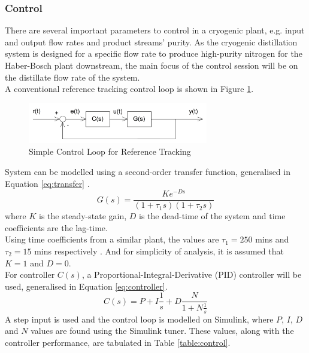 	\subsubsection{Control} \noindent
    	There are several important parameters to control in a cryogenic plant, e.g. input and output flow rates and product streams' purity. As the cryogenic distillation system is designed for a specific flow rate to produce high-purity nitrogen for the Haber-Bosch plant downstream, the main focus of the control session will be on the distillate flow rate of the system.\\
    	A conventional reference tracking control loop is shown in Figure \ref{fig:control_loop}.
    	\begin{figure}[H]
    	    \centering
    	    \includegraphics[width=0.7\textwidth]{airseparation/graphics/control_loop.jpg}
    	    \caption{Simple Control Loop for Reference Tracking}
    	    \label{fig:control_loop}
    	\end{figure}
    	\noindent System can be modelled using a second-order transfer function, generalised in Equation \ref{eq:transfer} \citep{control_transfer_function}.
    	\begin{equation}
    	    G(s) = \frac{Ke^{-Ds}}{(1+\tau _1s)(1+\tau _2s)}
    	    \label{eq:transfer}
    	\end{equation}
    	where $K$ is the steady-state gain, $D$ is the dead-time of the system and time coefficients are the lag-time. \\
    	Using time coefficients from a similar plant, the values are $\tau _1 = 250$ mins and $\tau _2 = 15$ mins respectively \citep{control_time_coefficient}. And for simplicity of analysis, it is assumed that $K = 1$ and $D = 0$.\\
    	For controller $C(s)$, a Proportional-Integral-Derivative (PID) controller will be used, generalised in Equation \ref{eq:controller}.
    	\begin{equation}
    	    C(s) = P+I\frac{1}{s}+D\frac{N}{1+N\frac{1}{s}}
    	    \label{eq:controller}
    	\end{equation}
    	A step input is used and the control loop is modelled on Simulink, where $P$, $I$, $D$ and $N$ values are found using the Simulink tuner. These values, along with the controller performance, are tabulated in Table \ref{table:control}.
